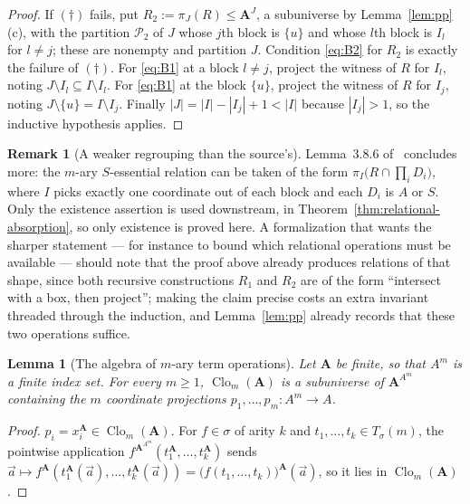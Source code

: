 \documentclass[11pt]{article}
\theoremstyle{mainplain}
\newtheorem{lemma}[theorem]{Lemma}
\theoremstyle{mainroman}
\theoremstyle{definition}
\newtheorem{remark}[theorem]{Remark}
\numberwithin{equation}{section}
\DeclareMathOperator{\Clo}{Clo}
\newcommand{\bA}{\mathbf A}
\newcommand{\Tm}{T_\sigma}
\begin{document}
\begin{proof}
If $(\dagger)$ fails, put $R_2:=\pi_{J}(R)\le\bA^{J}$, a subuniverse by
Lemma~\ref{lem:pp}(c), with the partition $\mathcal P_2$ of $J$ whose $j$th
block is $\{u\}$ and whose $l$th block is $I_l$ for $l\ne j$; these are
nonempty and partition $J$. Condition \eqref{eq:B2} for $R_2$ is exactly the
failure of $(\dagger)$. For \eqref{eq:B1} at a block $l\ne j$, project the
witness of $R$ for $I_l$, noting $J\setminus I_l\subseteq I\setminus I_l$. For
\eqref{eq:B1} at the block $\{u\}$, project the witness of $R$ for $I_j$,
noting $J\setminus\{u\}=I\setminus I_j$. Finally $|J|=|I|-|I_j|+1<|I|$ because
$|I_j|>1$, so the inductive hypothesis applies.
\end{proof}

\begin{remark}[A weaker regrouping than the source's]\label{rem:regrouping-weaker}
Lemma~3.8.6 of~\cite{BradyNotes} concludes more: the $m$-ary $S$-essential
relation can be taken of the form $\pi_I\bigl(R\cap\prod_i D_i\bigr)$, where
$I$ picks exactly one coordinate out of each block and each $D_i$ is $A$ or
$S$. Only the existence assertion is used downstream, in
Theorem~\ref{thm:relational-absorption}, so only existence is proved here. A
formalization that wants the sharper statement --- for instance to bound which
relational operations must be available --- should note that the proof above
already produces relations of that shape, since both recursive constructions
$R_1$ and $R_2$ are of the form ``intersect with a box, then project''; making
the claim precise costs an extra invariant threaded through the induction, and
Lemma~\ref{lem:pp} already records that these two operations suffice.
\end{remark}

\begin{lemma}[The algebra of $m$-ary term operations]\label{lem:clo-subuniverse}
Let $\bA$ be finite, so that $A^m$ is a finite index set. For every $m\ge1$,
$\Clo_m(\bA)$ is a subuniverse of $\bA^{A^m}$ containing the $m$ coordinate
projections $p_1,\dots,p_m:A^m\to A$.
\end{lemma}
\begin{proof}
$p_i=x_i^{\bA}\in\Clo_m(\bA)$. For $f\in\sigma$ of arity $k$ and
$t_1,\dots,t_k\in\Tm(m)$, the pointwise application
$f^{\bA^{A^m}}(t_1^{\bA},\dots,t_k^{\bA})$ sends $\vec a\mapsto
f^{\bA}(t_1^{\bA}(\vec a),\dots,t_k^{\bA}(\vec a))
=\bigl(f(t_1,\dots,t_k)\bigr)^{\bA}(\vec a)$, so it lies in $\Clo_m(\bA)$.
\end{proof}
\end{document}
